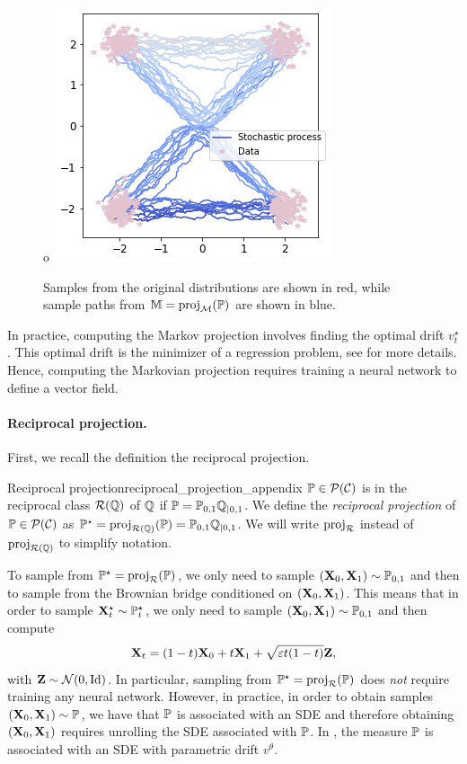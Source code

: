 \documentclass{article}
\begin{document}
\begin{figure}[H]
    \centering
o    \includegraphics[width=.4\linewidth]{img/markov_projection.png}
    \caption{Samples from the original distributions are shown in red, while sample paths from $\mathbb{M} = \mathrm{proj}_{\mathcal{M}}(\mathbb{P})$ are shown in blue.}
    \label{fig:markov_projection}
\end{figure}

In practice, computing the Markov projection involves finding the optimal drift $v_t^\star$. This optimal drift is the minimizer of a regression problem, see \citep{shi2023DSBM} for more details. Hence, computing the Markovian projection requires training a neural network to define a vector field. 


\paragraph{Reciprocal projection.} First, we recall the definition the reciprocal projection. 

\begin{definitionblue}{Reciprocal projection}{reciprocal_projection_appendix}
  $\mathbb{P} \in \mathcal{P}(\mathcal{C})$ is in the reciprocal class $\mathcal{R}(\mathbb{Q})$ of $\mathbb{Q}$ if
  $\mathbb{P} = \mathbb{P}_{0,1} \mathbb{Q}_{|0,1}$. 
  We define the
  \emph{reciprocal projection} of $\mathbb{P} \in \mathcal{P}(\mathcal{C})$ as
  $\mathbb{P}^\star = \mathrm{proj}_{\mathcal{R}(\mathbb{Q})}(\mathbb{P}) =  \mathbb{P}_{0,1} \mathbb{Q}_{|0,1} $. We will write $\mathrm{proj}_{\mathcal{R}}$ instead of $\mathrm{proj}_{\mathcal{R}(\mathbb{Q})}$ to simplify notation.
\end{definitionblue}

To sample from $\mathbb{P}^\star = \mathrm{proj}_{\mathcal{R}}(\mathbb{P})$, we only need to sample $(\mathbf{X}_0, \mathbf{X}_1) \sim \mathbb{P}_{0,1}$ and then to sample from the Brownian bridge conditioned on $(\mathbf{X}_0, \mathbf{X}_1)$. This means that in order to sample $\mathbf{X}_t^\star \sim \mathbb{P}^\star_t$, we only need to sample $(\mathbf{X}_0, \mathbf{X}_1) \sim \mathbb{P}_{0,1}$ and then compute 
\begin{equation}
\label{eq:interpolation_appendix_brownian}
    \bfX_t = (1-t) \bfX_0 + t \bfX_1 + \sqrt{\vareps t (1-t)} \bfZ ,
\end{equation}
with $\mathbf{Z} \sim \mathcal{N}(0, \mathrm{Id})$. In particular, sampling from $\mathbb{P}^\star = \mathrm{proj}_{\mathcal{R}}(\mathbb{P})$ does \emph{not} require training any neural network. However, in practice, in order to obtain samples $(\mathbf{X}_0, \mathbf{X}_1) \sim \mathbb{P}$, we have that $\mathbb{P}$ is associated with an SDE and therefore obtaining $(\mathbf{X}_0, \mathbf{X}_1)$ requires unrolling the SDE associated with $\mathbb{P}$. In , the measure $\mathbb{P}$ is associated with an SDE with parametric drift $v^\theta$. 
\end{document}
